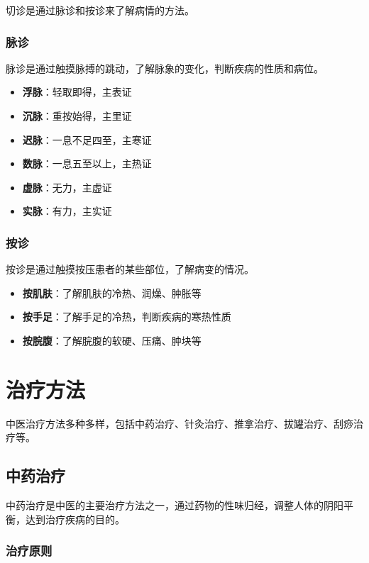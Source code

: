 \documentclass[12pt,UTF8]{ctexbook}
\begin{document}
切诊是通过脉诊和按诊来了解病情的方法。

\subsubsection{脉诊}

脉诊是通过触摸脉搏的跳动，了解脉象的变化，判断疾病的性质和病位。

\begin{itemize}
\item \textbf{浮脉}：轻取即得，主表证
\item \textbf{沉脉}：重按始得，主里证
\item \textbf{迟脉}：一息不足四至，主寒证
\item \textbf{数脉}：一息五至以上，主热证
\item \textbf{虚脉}：无力，主虚证
\item \textbf{实脉}：有力，主实证
\end{itemize}

\subsubsection{按诊}

按诊是通过触摸按压患者的某些部位，了解病变的情况。

\begin{itemize}
\item \textbf{按肌肤}：了解肌肤的冷热、润燥、肿胀等
\item \textbf{按手足}：了解手足的冷热，判断疾病的寒热性质
\item \textbf{按脘腹}：了解脘腹的软硬、压痛、肿块等
\end{itemize}

\section{治疗方法}

中医治疗方法多种多样，包括中药治疗、针灸治疗、推拿治疗、拔罐治疗、刮痧治疗等。

\subsection{中药治疗}

中药治疗是中医的主要治疗方法之一，通过药物的性味归经，调整人体的阴阳平衡，达到治疗疾病的目的。

\subsubsection{治疗原则}
\end{document}
